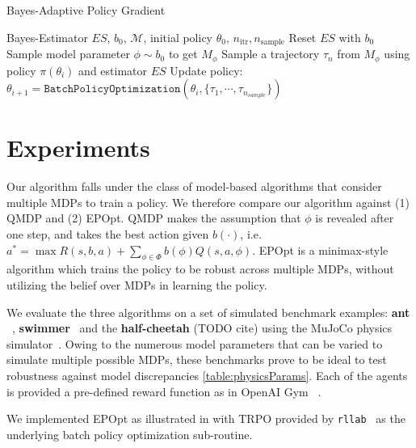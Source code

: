 \documentclass{article}
\DeclareMathOperator*{\argmin}{arg\,min}
\begin{document}
%
%
\begin{algorithm}[tb]
\caption{Bayes-Adaptive Policy Gradient}
\label{algo:bapg}
\begin{algorithmic}[1]
\Require Bayes-Estimator $ES$, $b_0$, $\mathcal{M}$, initial policy $\theta_0$, $n_\text{itr}, n_\text{sample}$
\vspace{2mm}
    \State Reset $ES$ with $b_0$
    \State Sample model parameter $\phi \sim b_0$ to get $M_{\phi}$
    \State Sample a trajectory $\tau_n$ from $M_{\phi}$ using policy $\pi(\theta_i)$ and estimator $ES$
  \EndFor
  \State Update policy: $\theta_{i+1} = \texttt{BatchPolicyOptimization}(\theta_i, \{\tau_1, \cdots, \tau_{n_{sample}}\})$
\EndFor
\end{algorithmic}
\end{algorithm}

\section{Experiments}

Our algorithm falls under the class of model-based algorithms that consider multiple MDPs to train a policy. We therefore compare our algorithm against (1) QMDP and (2) EPOpt. QMDP makes the assumption that $\phi$ is revealed after one step, and takes the best action given $b(\cdot)$, i.e. $a^* = \max R(s,b,a) + \sum_{\phi\in\Phi} b(\phi)Q(s,a,\phi)$. EPOpt is a minimax-style algorithm which trains the policy to be robust across multiple MDPs, without utilizing the belief over MDPs in learning the policy.

We evaluate the three algorithms on a set of simulated benchmark examples: \textbf{ant} ~\cite{schulman2015high}, \textbf{swimmer}~\cite{coulom2002reinforcement} and the \textbf{half-cheetah} (TODO cite) using the MuJoCo physics simulator~\cite{todorov2012mujoco}. 
Owing to the numerous model parameters that can be varied to simulate multiple possible MDPs, these benchmarks prove to be ideal to test robustness against model discrepancies \ref{table:physicsParams}. 
Each of the agents is provided a pre-defined reward function as in OpenAI Gym ~\cite{openai}. 

We implemented EPOpt as illustrated in \cite{rajeswaran2016epopt} with TRPO \cite{trpo} provided by \texttt{rllab}~\cite{duan2016benchmarking} as the underlying batch policy optimization sub-routine.
\end{document}
